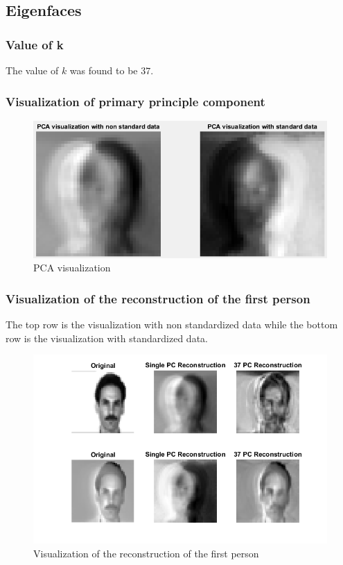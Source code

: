 \documentclass[12pt]{article}
\begin{document}
\newpage
\subsection{Eigenfaces}

\subsubsection{Value of k}
The value of $k$ was found to be $37$.
\subsubsection{Visualization of primary principle component}
\begin{center}

\begin{figure}[h!]
\includegraphics[scale=1.0]{Eigenfaces1.png}
\caption{PCA visualization}
\end{figure}

\end{center}
\newpage
\subsubsection{Visualization of the reconstruction of the first person}
The top row is the visualization with non standardized data while the bottom row is the visualization with standardized data.
\begin{figure}[h!]
\begin{center}
\includegraphics[scale=1.0]{Eigenfaces2.png}
\caption{Visualization of the reconstruction of the first person}
\end{center}
\end{figure}
\end{document}
